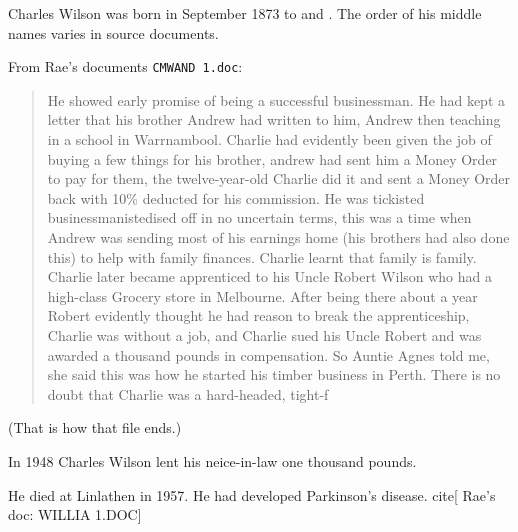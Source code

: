 
Charles Wilson was born in September 1873 to  and .
The order of his middle names varies in source documents.

From Rae's documents \texttt{CMWAND 1.doc}:

\begin{quotation}
He showed early promise of being a successful businessman. He had kept a letter that his brother Andrew had written to him, Andrew then teaching in a school in Warrnambool. Charlie had evidently been given the job of buying a few things for his brother, andrew had sent him a Money Order to pay for them, the twelve-year-old Charlie did it and sent a Money Order back with 10\% deducted for his commission. He was tickisted businessmanistedised off in no uncertain terms, this was a time when Andrew was sending most of his earnings home (his brothers had also done this) to help with family finances. Charlie learnt that family is family. Charlie later became apprenticed to his Uncle Robert Wilson who had a high-class Grocery store in Melbourne. After being there about a year Robert evidently thought he had reason to break the apprenticeship, Charlie was without a job, and Charlie sued his Uncle Robert and was awarded a thousand pounds in compensation. So Auntie Agnes told me, she said this was how he started his timber business in Perth. There is no doubt that Charlie was a hard-headed, tight-f
\end{quotation}

(That is how that file ends.)

In 1948 Charles Wilson lent his neice-in-law  one thousand pounds.

He died at Linlathen in 1957. He had developed Parkinson’s disease. cite[ Rae's doc: WILLIA 1.DOC]
